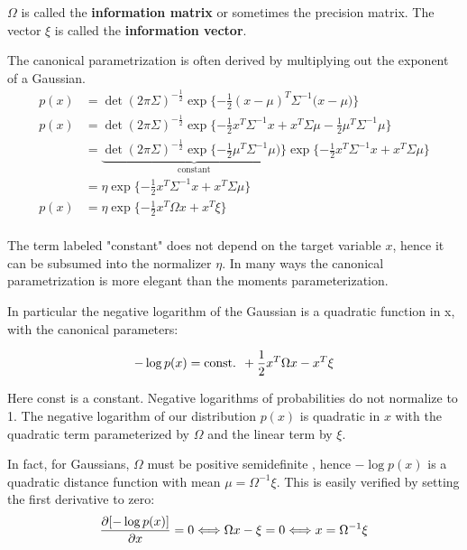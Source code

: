 $\Omega$ is called the \textbf{information matrix} or sometimes the precision matrix.
The vector $\xi$ is called the \textbf{information vector}.

The canonical parametrization is often derived by multiplying out the exponent of a Gaussian.
\begin{align}
  p(x) &= \det{(2\pi\Sigma)^{-\frac{1}{2}}} \exp{\{-\frac{1}{2}(x-\mu)^{T}\Sigma^{-1}(x-\mu})\} \\
  p(x) &= \det{(2\pi\Sigma)^{-\frac{1}{2}}} \exp{\{-\frac{1}{2} x^T\Sigma^{-1}x + x^T\Sigma\mu -\frac{1}{2} \mu^T\Sigma^{-1}\mu}\} \\
           &= \underbrace{\det{(2\pi\Sigma)^{-\frac{1}{2}}} \exp{\{-\frac{1}{2} \mu^T\Sigma^{-1}\mu})\}}_{\text{constant}} \exp{\{-\frac{1}{2} x^T\Sigma^{-1}x + x^T\Sigma\mu}\} \\
           &= \eta \exp{\{-\frac{1}{2} x^T\Sigma^{-1}x + x^T\Sigma\mu}\} \\
        p(x)   &= \eta \exp{\{-\frac{1}{2} x^T\Omega x + x^T\xi}\} \\
\end{align}

The term labeled "constant" does not depend on the target variable $x$, hence it can be subsumed into the normalizer $\eta$.
In many ways the canonical parametrization is more elegant than the moments parameterization.

In particular the negative logarithm of the Gaussian is a quadratic function in x, with the canonical parameters:

\begin{equation}
  -\log{p(x)} = \text{const. } + \frac{1}{2} x^T \Omega x - x^T \xi \\
  \label{eq:Negative logarithm of gaussian in canonical parametrization}
\end{equation}

Here const is a constant. Negative logarithms of probabilities do not normalize to 1.
The negative logarithm of our distribution $p(x)$ is quadratic in $x$ with the quadratic term parameterized by $\Omega$ and the linear term by $\xi$.

In fact, for Gaussians, $\Omega$ must be positive semidefinite , hence $-\log{p(x)}$ is a quadratic distance function with mean $\mu=\Omega^{-1}\xi$.
This is easily verified by setting the first derivative to zero:
\begin{equation}
  \frac{\partial{ [-\log{p(x)}] }}{\partial{x}} = 0 \Longleftrightarrow \Omega x - \xi = 0 \Longleftrightarrow x = \Omega^{-1}\xi\\
  \label{eq:First derivative of negative log og Gaussian in canonical form}
\end{equation}


